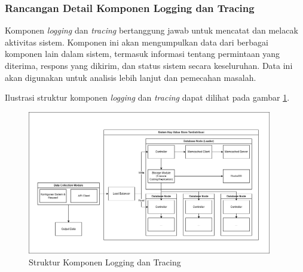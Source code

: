 \subsubsection{Rancangan Detail Komponen Logging dan Tracing}
\label{subsubsection:detail-data-collector}

Komponen \textit{logging} dan \textit{tracing} bertanggung jawab untuk mencatat dan melacak aktivitas sistem. Komponen ini akan mengumpulkan data dari berbagai komponen lain dalam sistem, termasuk informasi tentang permintaan yang diterima, respons yang dikirim, dan status sistem secara keseluruhan. Data ini akan digunakan untuk analisis lebih lanjut dan pemecahan masalah.

Ilustrasi struktur komponen \textit{logging} dan \textit{tracing} dapat dilihat pada gambar \ref{fig:logging-tracing-structure}.

\begin{figure}[ht]
    \centering
    \includegraphics[width=0.95\textwidth]{resources/chapter-3/general-architecture.png}
    \caption{Struktur Komponen Logging dan Tracing}
    \label{fig:logging-tracing-structure}
\end{figure}
